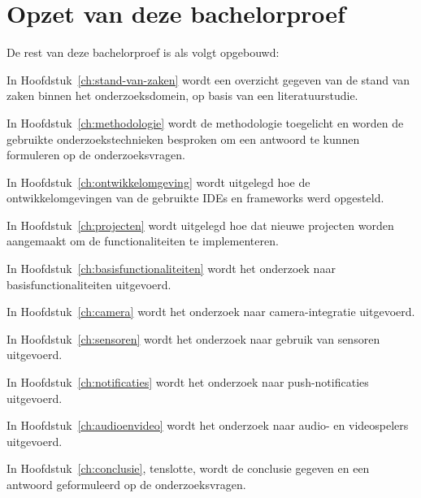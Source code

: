 \section{Opzet van deze bachelorproef}%
\label{sec:opzet-bachelorproef}


De rest van deze bachelorproef is als volgt opgebouwd:

In Hoofdstuk~\ref{ch:stand-van-zaken} wordt een overzicht gegeven van de stand van zaken binnen het onderzoeksdomein, op basis van een literatuurstudie.

In Hoofdstuk~\ref{ch:methodologie} wordt de methodologie toegelicht en worden de gebruikte onderzoekstechnieken besproken om een antwoord te kunnen formuleren op de onderzoeksvragen.

In Hoofdstuk~\ref{ch:ontwikkelomgeving} wordt uitgelegd hoe de ontwikkelomgevingen van de gebruikte IDEs en frameworks werd opgesteld.

In Hoofdstuk~\ref{ch:projecten} wordt uitgelegd hoe dat nieuwe projecten worden aangemaakt om de functionaliteiten te implementeren.

In Hoofdstuk~\ref{ch:basisfunctionaliteiten} wordt het onderzoek naar basisfunctionaliteiten uitgevoerd.

In Hoofdstuk~\ref{ch:camera} wordt het onderzoek naar camera-integratie uitgevoerd.

In Hoofdstuk~\ref{ch:sensoren} wordt het onderzoek naar gebruik van sensoren uitgevoerd.

In Hoofdstuk~\ref{ch:notificaties} wordt het onderzoek naar push-notificaties uitgevoerd.

In Hoofdstuk~\ref{ch:audioenvideo} wordt het onderzoek naar audio- en videospelers uitgevoerd.

In Hoofdstuk~\ref{ch:conclusie}, tenslotte, wordt de conclusie gegeven en een antwoord geformuleerd op de onderzoeksvragen.














